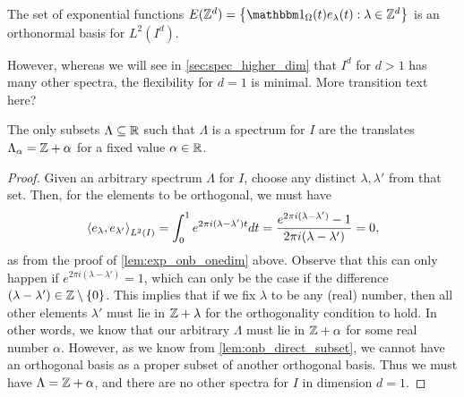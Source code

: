\documentclass[../thesis.tex]{subfiles}
\begin{document}
\begin{theorem}\label{lem:z_d_in_higer_d}
    The set of exponential functions $E(\Z^d) = \braqMed{\indicator{\Omega}{t} e_\lambda(t) : \lambda \in \Z^d}$ is an orthonormal basis for $L^2(I^d)$.
\end{theorem}
However, whereas we will see in \cref{sec:spec_higher_dim} that $I^d$ for $d>1$ has many other spectra, the flexibility for $d=1$ is minimal. %
\colorbox{BurntOrange}{More transition text here?}
\begin{proposition}\label{prop:class_all_shift}
    The only subsets $\Lambda \subseteq \mathbb{R}$ such that $\Lambda$ is a spectrum for $I$ are the translates $\Lambda_\alpha = \mathbb{Z} + \alpha$ for a fixed value $\alpha \in \mathbb{R}$.
\end{proposition}
\begin{proof} %
    Given an arbitrary spectrum $\Lambda$ for $I$, choose any distinct $\lambda,\lambda'$ from that set. Then, for the elements to be orthogonal, we must have
    \begin{equation}\label{eq:zero_set_equation}
        \left \langle e_{\lambda},e_{\lambda'}  \right \rangle_{L^2(I)} = \int_0^1 e^{2 \pi i (\lambda-\lambda')t} dt =\frac{e^{2 \pi i (\lambda - \lambda')} -1}{2 \pi i (\lambda-\lambda')} = 0,
    \end{equation}
    as from the proof of \cref{lem:exp_onb_onedim} above. Observe that this can only happen if $e^{2\pi i (\lambda-\lambda')} = 1$, which can only be the case if the difference $(\lambda-\lambda') \in \mathbb{Z}\setminus\{0\}$. This implies that if we fix $\lambda$ to be any (real) number, then all other elements $\lambda'$ must lie in $\mathbb{Z} + \lambda$ for the orthogonality condition to hold. In other words, we know that our arbitrary $\Lambda$ must lie in $\mathbb{Z}+\alpha$ for some real number $\alpha$. However, as we know from \cref{lem:onb_direct_subset}, we cannot have an orthogonal basis as a proper subset of another orthogonal basis. Thus we must have $\Lambda = \mathbb{Z}+\alpha$, and there are no other spectra for $I$ in dimension $d=1$.
\end{proof} %
\end{document}
